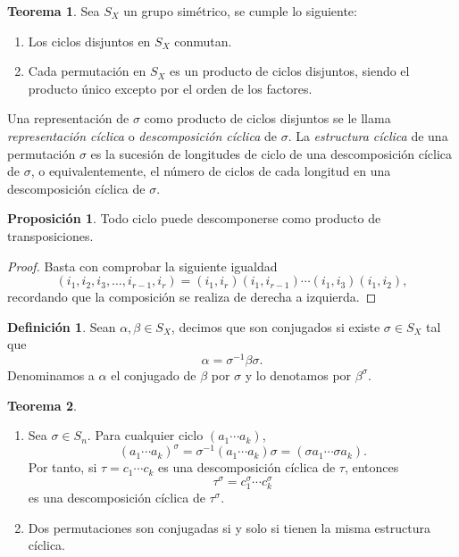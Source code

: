 \documentclass[12pt]{book}
\theoremstyle{definition}
\newtheorem{defi}{Definición}[section]
\newtheorem{teor}{Teorema}[section]
\newtheorem{prop}{Proposición}[section]
\begin{document}
\begin{teor}
Sea $S_X$ un grupo simétrico, se cumple lo siguiente:
\begin{enumerate}
\item Los ciclos disjuntos en $S_X$ conmutan.
\item Cada permutación en $S_X$ es un producto de ciclos disjuntos, siendo el producto único excepto por el orden de los factores. 
\end{enumerate}
\label{teor:trans}
\end{teor}
Una representación de $\sigma$ como producto de ciclos disjuntos se le llama \textit{representación cíclica} o \textit{descomposición cíclica} de $\sigma$. La \textit{estructura cíclica} de una permutación $\sigma$ es la sucesión de longitudes de ciclo de una descomposición cíclica de $\sigma$, o equivalentemente, el número de ciclos de cada longitud en una descomposición cíclica de $\sigma$. 
\begin{prop}
Todo ciclo puede descomponerse como producto de transposiciones.
\label{prop:trans}
\end{prop}
\begin{proof} Basta con comprobar la siguiente igualdad
$$(i_1,i_2,i_3,\ldots,i_{r-1},i_r) = (i_1,i_r)(i_1,i_{r-1})\cdots(i_1,i_3)(i_1,i_2),$$
recordando que la composición se realiza de derecha a izquierda.
\end{proof}

\begin{defi}
Sean $\alpha,\beta\in S_X$, decimos que son conjugados si existe $\sigma\in S_X$ tal que $$\alpha = \sigma^{-1}\beta\sigma.$$
Denominamos a $\alpha$ el conjugado de $\beta$ por $\sigma$ y lo denotamos por $\beta^\sigma$.
\end{defi}


\begin{teor}
\ 

\begin{enumerate}
\item Sea $\sigma\in S_n$. Para cualquier ciclo $(a_1\cdots a_k)$,
$$(a_1 \cdots a_k)^\sigma= \sigma^{-1}(a_1 \cdots a_k)\sigma = (\sigma a_1 \cdots \sigma a_k).$$
Por tanto, si $\tau=c_1\cdots c_k$ es una descomposición cíclica de $\tau$, entonces
$$\tau^\sigma = c_1^\sigma\cdots c_k^\sigma$$
es una descomposición cíclica de $\tau^\sigma$.
\item Dos permutaciones son conjugadas si y solo si tienen la misma estructura cíclica.
\end{enumerate}
\end{teor}
\end{document}
